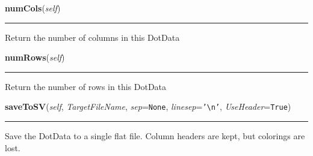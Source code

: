     \vspace{0.5ex}

\hspace{.8\funcindent}\begin{boxedminipage}{\funcwidth}

    \raggedright \textbf{numCols}(\textit{self})

    \vspace{-1.5ex}

    \rule{\textwidth}{0.5\fboxrule}
\setlength{\parskip}{2ex}
    Return the number of columns in this DotData

\setlength{\parskip}{1ex}
    \end{boxedminipage}

    \label{Classes:DotData:DotData:numRows}

    \vspace{0.5ex}

\hspace{.8\funcindent}\begin{boxedminipage}{\funcwidth}

    \raggedright \textbf{numRows}(\textit{self})

    \vspace{-1.5ex}

    \rule{\textwidth}{0.5\fboxrule}
\setlength{\parskip}{2ex}
    Return the number of rows in this DotData

\setlength{\parskip}{1ex}
    \end{boxedminipage}

    \label{Classes:DotData:DotData:saveToSV}

    \vspace{0.5ex}

\hspace{.8\funcindent}\begin{boxedminipage}{\funcwidth}

    \raggedright \textbf{saveToSV}(\textit{self}, \textit{TargetFileName}, \textit{sep}={\tt None}, \textit{linesep}={\tt '{\textbackslash}n'}, \textit{UseHeader}={\tt True})

    \vspace{-1.5ex}

    \rule{\textwidth}{0.5\fboxrule}
\setlength{\parskip}{2ex}
    Save the DotData to a single flat file.  Column headers are kept, but 
    colorings are lost.

\setlength{\parskip}{1ex}
    \end{boxedminipage}

